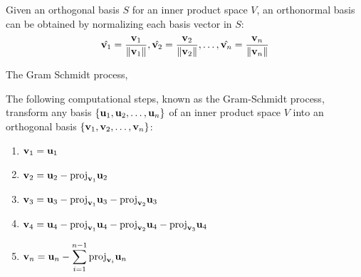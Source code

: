 \documentclass[12pt]{article}
\begin{document}
\begin{theorem}
    Given an orthogonal basis $S$ for an inner product space $V$, an orthonormal basis can be obtained by normalizing each basis vector in $S$:
    $$\hat{\mathbf{v}_1} = \frac{\mathbf{v}_1}{\norm{\mathbf{v}_1}}, \hat{\mathbf{v}_2} = \frac{\mathbf{v}_2}{\norm{\mathbf{v}_2}}, \ldots, \hat{\mathbf{v}_n} = \frac{\mathbf{v}_n}{\norm{\mathbf{v}_n}}$$
\end{theorem}

The Gram Schmidt process, 

\begin{theorem}
    The following computational steps, known as the Gram-Schmidt process, transform any basis \(\{\mathbf{u}_1, \mathbf{u}_2, \ldots, \mathbf{u}_n\}\) of an inner product space \(V\) into an orthogonal basis \(\{\mathbf{v}_1, \mathbf{v}_2, \ldots, \mathbf{v}_n\}\):

        \begin{enumerate}
            \item \(\mathbf{v}_1 = \mathbf{u}_1\)
            
            \item \(\mathbf{v}_2 = \mathbf{u}_2 - \text{proj}_{\mathbf{v}_1}{\mathbf{u}_2}\)
            
            \item \(\mathbf{v}_3 = \mathbf{u}_3 - \text{proj}_{\mathbf{v}_1}{\mathbf{u}_3} - \text{proj}_{\mathbf{v}_2}{\mathbf{u}_3}\)
            
            \item \(\mathbf{v}_4 = \mathbf{u}_4 - \text{proj}_{\mathbf{v}_1}{\mathbf{u}_4} - \text{proj}_{\mathbf{v}_2}{\mathbf{u}_4} - \text{proj}_{\mathbf{v}_3}{\mathbf{u}_4}\)
             
            \item[n.] \(\displaystyle \mathbf{v}_n = \mathbf{u}_n - \sum_{i=1}^{n-1} \text{proj}_{\mathbf{v}_i}{\mathbf{u}_n}\)
        \end{enumerate}
\end{theorem}
\end{document}
